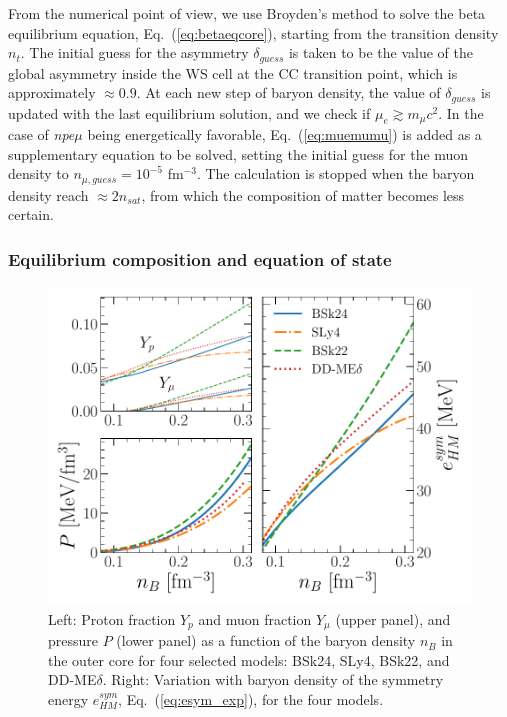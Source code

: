 From the numerical point of view, we use Broyden's method to solve the beta
equilibrium equation, Eq.~(\ref{eq:betaeqcore}), starting from the transition 
density $n_t$. The initial guess for the asymmetry $\delta_{guess}$ is taken to be 
the value of the global asymmetry inside the WS cell at the CC transition 
point, which is approximately $\approx 0.9$. At each new step of baryon 
density, the value of 
$\delta_{guess}$ is updated with the last equilibrium solution, and we check
if $\mu_e \gtrsim m_\mu c^2$. In the case of \textit{npe$\mu$} being
energetically favorable, Eq.~(\ref{eq:muemumu}) is added as a supplementary
equation to be solved, setting the initial guess for the muon density to
$n_{\mu,guess} = 10^{-5}$ fm$^{-3}$.  The calculation is stopped when the 
baryon density reach $\approx 2n_{sat}$, from which the composition of matter 
becomes less certain.

\subsubsection{Equilibrium composition and equation of state}

\begin{figure}[!t]
\begin{center}
  \includegraphics[width=0.9\linewidth]{figures/ocore.pdf}
\end{center}
\caption[Equilibrium composition, pressure, and symmetry energy versus baryon
density in the outer core]{Left: Proton fraction $Y_p$ and muon fraction 
  $Y_\mu$ (upper panel), and pressure $P$ (lower panel) as a function of the 
  baryon density $n_B$ in the outer core for four selected models: BSk24, SLy4, 
  BSk22, and DD-ME$\delta$. Right: Variation with baryon density of the symmetry 
energy $e_{HM}^{sym}$, Eq.~(\ref{eq:esym_exp}), for the four 
models.}\label{fig:ocore}
\end{figure}

